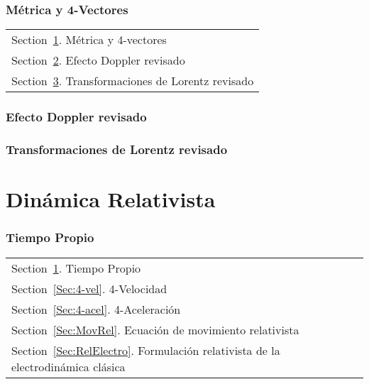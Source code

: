 \documentclass[../main]{subfiles}
\begin{document}
\section{Métrica y 4-Vectores}\label{Sec:4-vec}
        \begin{margintable}\vspace{1.4in}\footnotesize
		\begin{tabularx}{\marginparwidth}{|X}
        Section~\ref{Sec:4-vec}. Métrica y 4-vectores\\
        Section~\ref{Sec:DoplRev}. Efecto Doppler revisado\\
        Section~\ref{Sec:LorentzRev}. Transformaciones de Lorentz revisado\\
		\end{tabularx}
        \end{margintable}

        \lipsum[1]

        \section{Efecto Doppler revisado}\label{Sec:DoplRev}
        \begin{fullpage}
            \lipsum[1]
        \end{fullpage}

        \section{Transformaciones de Lorentz revisado}\label{Sec:LorentzRev}
        \begin{fullpage}
            \lipsum[1]
        \end{fullpage}
        
        \part{Dinámica Relativista}\label{Part:Dinámica}

        \section{Tiempo Propio}\label{Sec:TiemPropio}

        \begin{margintable}\vspace{1.4in}\footnotesize
		\begin{tabularx}{\marginparwidth}{|X}
        Section~\ref{Sec:TiemPropio}. Tiempo Propio\\
        Section~\ref{Sec:4-vel}. 4-Velocidad\\
        Section~\ref{Sec:4-acel}. 4-Aceleración\\
        Section~\ref{Sec:MovRel}. Ecuación de movimiento relativista\\
        Section~\ref{Sec:RelElectro}. Formulación relativista de la electrodinámica clásica\\
		\end{tabularx}
        \end{margintable}
\end{document}
